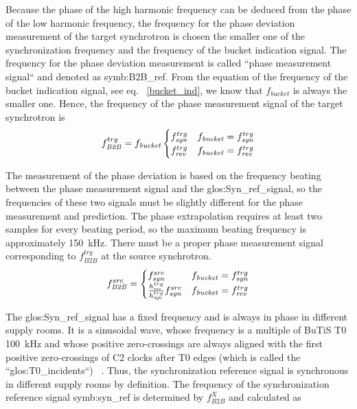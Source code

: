 Because the phase of the high harmonic frequency can be deduced from the phase of the low harmonic frequency, the frequency for the phase deviation measurement of the target synchrotron is chosen the smaller one of the synchronization frequency and the frequency of the bucket indication signal. The frequency for the phase deviation measurement is called ``phase measurement signal`` and denoted as \gls{symb:B2B_ref}. From the equation of the frequency of the bucket indication signal, see eq. ~\ref{bucket_ind}, we know that $f_\mathit{bucket}$ is always the smaller one. Hence, the frequency of the phase measurement signal of the target synchrotron is
\begin{eqnarray}
f_{\mathit{B2B}}^{trg}=f_{\mathit{bucket}}
\begin{cases}
f_{\mathit{syn}}^{trg} &f_{\mathit{bucket}}=f_{\mathit{syn}}^{trg}\cr

f_{\mathit{rev}}^{trg} &f_{\mathit{bucket}}=f_{\mathit{rev}}^{trg}
\end{cases}
\end{eqnarray}

The measurement of the phase deviation is based on the frequency beating between the phase measurement signal and the \gls{glos:Syn_ref_signal}, so the frequencies of these two signals must be slightly different for the phase measurement and prediction. The phase extrapolation requires at least two samples for every beating period, so the maximum beating frequency is approximately \SI{150}{kHz}. There must be a proper phase measurement signal corresponding to $f_{\mathit{B2B}}^{trg}$ at the source synchrotron.
\begin{eqnarray}
f_{\mathit{B2B}}^{src}=
\begin{cases}
f_{\mathit{syn}}^{src} &f_{\mathit{bucket}}=f_{\mathit{syn}}^{trg}\cr

\frac{h_{\mathit{rev}}^{trg}}{h_{\mathit{syn}}^{trg}}f_{\mathit{syn}}^{src} &f_{\mathit{bucket}}=f_{\mathit{rev}}^{trg}
\end{cases}
\end{eqnarray}

The \gls{glos:Syn_ref_signal} has a fixed frequency and is always in phase in different supply rooms. It is a sinusoidal wave, whose frequency is a multiple of BuTiS T0 \SI{100}{kHz} and whose positive zero-crossings are always aligned with the first positive zero-crossings of C2 clocks after T0 edges (which is called the ``\gls{glos:T0_incidents}``) ~\cite{ferrand_system_2014, ferrand_system_2015}. Thus, the synchronization reference signal is synchronous in different supply rooms by definition. The frequency of the synchronization reference signal \gls{symb:syn_ref} is determined by $f_{\mathit{B2B}}^{X}$ and calculated as

